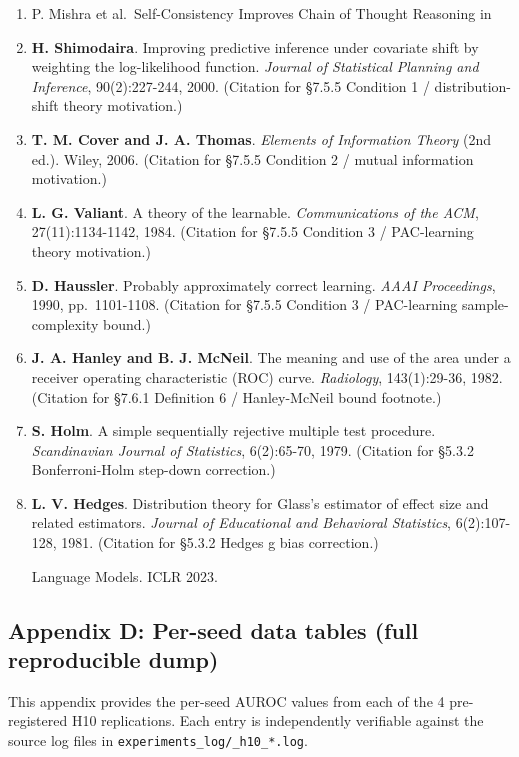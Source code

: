 \documentclass[
]{article}
\begin{document}
\begin{enumerate}
  Language Models. NeurIPS 2022.
\item
  P. Mishra et al.~Self-Consistency Improves Chain of Thought Reasoning
  in
\item
  \textbf{H. Shimodaira}. Improving predictive inference under covariate
  shift by weighting the log-likelihood function. \emph{Journal of
  Statistical Planning and Inference}, 90(2):227-244, 2000. (Citation
  for §7.5.5 Condition 1 / distribution-shift theory motivation.)
\item
  \textbf{T. M. Cover and J. A. Thomas}. \emph{Elements of Information
  Theory} (2nd ed.). Wiley, 2006. (Citation for §7.5.5 Condition 2 /
  mutual information motivation.)
\item
  \textbf{L. G. Valiant}. A theory of the learnable.
  \emph{Communications of the ACM}, 27(11):1134-1142, 1984. (Citation
  for §7.5.5 Condition 3 / PAC-learning theory motivation.)
\item
  \textbf{D. Haussler}. Probably approximately correct learning.
  \emph{AAAI Proceedings}, 1990, pp.~1101-1108. (Citation for §7.5.5
  Condition 3 / PAC-learning sample-complexity bound.)
\item
  \textbf{J. A. Hanley and B. J. McNeil}. The meaning and use of the
  area under a receiver operating characteristic (ROC) curve.
  \emph{Radiology}, 143(1):29-36, 1982. (Citation for §7.6.1 Definition
  6 / Hanley-McNeil bound footnote.)
\item
  \textbf{S. Holm}. A simple sequentially rejective multiple test
  procedure. \emph{Scandinavian Journal of Statistics}, 6(2):65-70,
  1979. (Citation for §5.3.2 Bonferroni-Holm step-down correction.)
\item
  \textbf{L. V. Hedges}. Distribution theory for Glass's estimator of
  effect size and related estimators. \emph{Journal of Educational and
  Behavioral Statistics}, 6(2):107-128, 1981. (Citation for §5.3.2
  Hedges g bias correction.)

  Language Models. ICLR 2023.
\end{enumerate}

\subsection{Appendix D: Per-seed data tables (full reproducible
dump)}\label{appendix-d-per-seed-data-tables-full-reproducible-dump}

This appendix provides the per-seed AUROC values from each of the 4
pre-registered H10 replications. Each entry is independently verifiable
against the source log files in \texttt{experiments\_log/\_h10\_*.log}.
\end{document}
